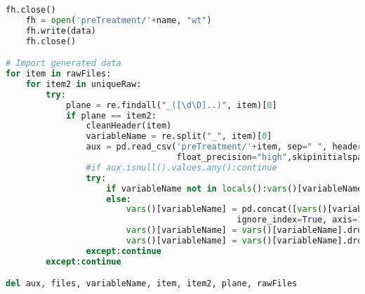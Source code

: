 \begin{lstlisting}[language=python]
    fh.close()
    fh = open('preTreatment/'+name, "wt")
    fh.write(data)
    fh.close()

# Import generated data
for item in rawFiles:
    for item2 in uniqueRaw:
        try:
            plane = re.findall("_([\d\D]..)", item)[0]
            if plane == item2:
                cleanHeader(item)
                variableName = re.split("_", item)[0]
                aux = pd.read_csv('preTreatment/'+item, sep=" ", header=1,
                                  float_precision="high",skipinitialspace=True)
                #if aux.isnull().values.any():continue
                try:
                    if variableName not in locals():vars()[variableName] = aux
                    else:
                        vars()[variableName] = pd.concat([vars()[variableName],aux],
                                              ignore_index=True, axis=1)
                        vars()[variableName] = vars()[variableName].dropna(axis=0, how='all')
                        vars()[variableName] = vars()[variableName].dropna(axis=1, how='all')
                except:continue
        except:continue

del aux, files, variableName, item, item2, plane, rawFiles

\end{lstlisting}


